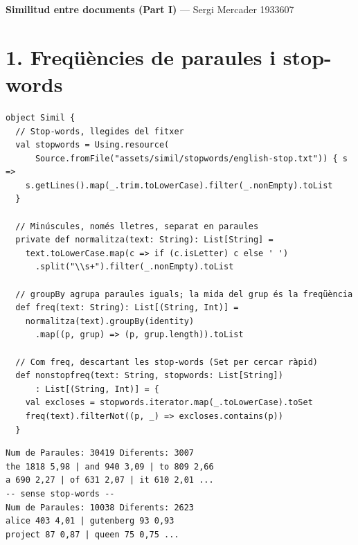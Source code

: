 \documentclass[10pt,a4paper,twocolumn]{article}
\begin{document}
\textbf{\large Similitud entre documents (Part I)} --- Sergi Mercader 1933607

\section*{1. Freqüències de paraules i stop-words}
\begin{lstlisting}[style=scalastyle]
object Simil {
  // Stop-words, llegides del fitxer
  val stopwords = Using.resource(
      Source.fromFile("assets/simil/stopwords/english-stop.txt")) { s =>
    s.getLines().map(_.trim.toLowerCase).filter(_.nonEmpty).toList
  }

  // Minúscules, només lletres, separat en paraules
  private def normalitza(text: String): List[String] =
    text.toLowerCase.map(c => if (c.isLetter) c else ' ')
      .split("\\s+").filter(_.nonEmpty).toList

  // groupBy agrupa paraules iguals; la mida del grup és la freqüència
  def freq(text: String): List[(String, Int)] =
    normalitza(text).groupBy(identity)
      .map((p, grup) => (p, grup.length)).toList

  // Com freq, descartant les stop-words (Set per cercar ràpid)
  def nonstopfreq(text: String, stopwords: List[String])
      : List[(String, Int)] = {
    val excloses = stopwords.iterator.map(_.toLowerCase).toSet
    freq(text).filterNot((p, _) => excloses.contains(p))
  }
\end{lstlisting}
\begin{lstlisting}[style=outputstyle]
Num de Paraules: 30419 Diferents: 3007
the 1818 5,98 | and 940 3,09 | to 809 2,66
a 690 2,27 | of 631 2,07 | it 610 2,01 ...
-- sense stop-words --
Num de Paraules: 10038 Diferents: 2623
alice 403 4,01 | gutenberg 93 0,93
project 87 0,87 | queen 75 0,75 ...
\end{lstlisting}

\end{document}
